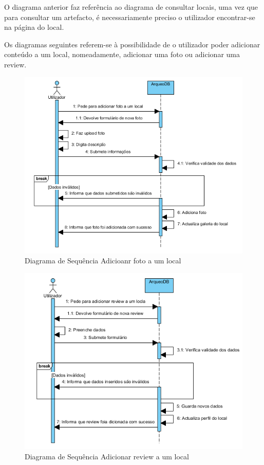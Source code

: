 ﻿\documentclass[12pt,a4paper]{article}
\begin{document}
O diagrama anterior faz referência ao diagrama de consultar locais, uma vez que para consultar um artefacto, é  necessariamente preciso o utilizador encontrar-se na página do local.

\clearpage
Os diagramas seguintes referem-se à possibilidade de o utilizador poder adicionar conteúdo a um local, nomeadamente, adicionar uma foto ou adicionar uma review.\\

\begin{figure}[h!]
\centering
\includegraphics[scale=1]{sequencia/adicionarfoto}
\caption{Diagrama de Sequência Adicioanr foto a um local} 
\end{figure}

\begin{figure}[h!]
\centering
\includegraphics[scale=1]{sequencia/adicionarreview}
\caption{Diagrama de Sequência Adicionar review a um local} 
\end{figure}
\end{document}
